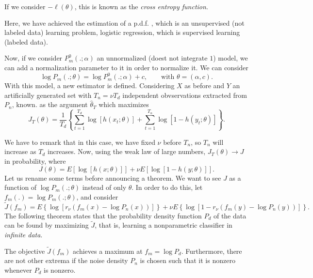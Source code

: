 \begin{remark}
If we consider $-\ell(\theta)$, this is known as the \emph{cross entropy function}.
\end{remark}

\begin{remark}
    Here, we have achieved the estimation of a p.d.f. , which is an unsupervised (not labeled data) learning problem, logistic regression, which is supervised learning (labeled data).
\end{remark}

Now, if we consider $P_m^0(.;\alpha)$ an unnormalized (doest not integrate $1$) model, we can add a normalization parameter to it in order to normalize it. We can consider
\[
\log P_m(.;\theta) = \log P_m^0(.;\alpha ) + c  , \quad \quad \text{with } \theta=(\alpha,c).
\]
With this model, a new estimator is defined. Considering $X$ as before and $Y$ an artificially generated set with $T_n = \nu T_d$ independent obvservations extracted from $P_n$, known. as the argument $\hat{\theta}_T$ which maximizes
\[
J_T(\theta) = \frac{1}{T_d}\left\{\sum_{t = 1}^{T_d} \log[h(x_t;\theta)] + \sum_{t=1}^{T_n}\log[1-h(y_t;\theta)]\right\}.
\]

We have to remark that in this case, we have fixed $\nu$ before $T_n$, so $T_n$ will increase as $T_d$ increases. Now, using the weak law of large numbers, $J_T(\theta) \to J$ in probability, where
\[
J(\theta) = E\left[\log[h(x;\theta)]\right] + \nu E\left[\log[1-h(y;\theta)]\right].
\]
Let us rename some terms before announcing a theorem. We want to see $J$ as a function of $\log P_m(.;\theta)$ instead of only $\theta$. In order to do this, let $f_m(.) = \log P_m(.;\theta)$, and consider
\[
\tilde{J}(f_m) = E\left\{\log[r_\nu (f_m(x) - \log P_n(x))]\right\} + \nu E\left\{\log [1- r_\nu(f_m(y) - \log P_n(y))]\right\}.    
\]
The following theorem states that the probability density function $P_d$ of the data can be found by maximizing $\tilde{J}$, that is, learning a nonparametric classifier in \emph{infinite data}.

\begin{nth}
The objective $\tilde{J}(f_m)$ achieves a maximum at $f_m = \log P_d$. Furthermore, there are not other extrema if the noise density $P_n$ is chosen such that it is nonzero whenever $P_d$ is nonzero.
\end{nth}